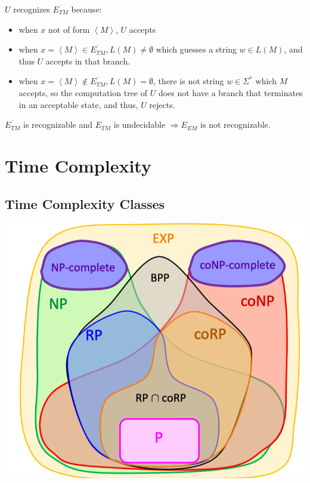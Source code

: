 \documentclass[10pt,landscape,a4paper]{article}
\newcommand{\encoding}[1]{\left \langle #1 \right \rangle}
\begin{document}
\begin{multicols*}{3}
$U$ recognizes $\overline{E_{TM}}$ because:

\begin{itemize}
    \item when $x$ not of form $\encoding{M}$, $U$ accepts
    \item when $x = \encoding{M} \in \overline{E_{TM}}, L(M) \neq \emptyset$ which guesses a string $w \in L(M)$, and thus $U$ accepts in that branch.
    \item when $x = \encoding{M} \notin \overline{E_{TM}}, L(M) = \emptyset$, there is not string $w \in \Sigma^*$ which $M$ accepts, so the computation tree of $U$ does not have a branch that terminates in an acceptable state, and thus, $U$ rejects.
\end{itemize}

$\overline{E_{TM}}$ is recognizable and $E_{TM}$ is undecidable $\Rightarrow E_{EM}$ is not recognizable.

\section{Time Complexity}

\subsection{Time Complexity Classes}

\includegraphics[scale=0.3]{time_complexity}


\end{multicols*}
\end{document}
